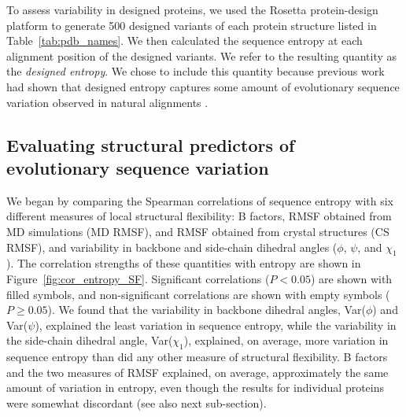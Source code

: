 \documentclass[smallextended]{svjour3}
\begin{document}
To assess variability in designed proteins, we used the Rosetta protein-design platform to generate 500 designed variants of each protein structure listed in Table~\ref{tab:pdb_names}. We then calculated the sequence entropy at each alignment position of the designed variants. We refer to the resulting quantity as the \emph{designed entropy}. We chose to include this quantity because previous work had shown that designed entropy captures some amount of evolutionary sequence variation observed in natural alignments \citep{Jacksonetal2013}.

\subsection*{Evaluating structural predictors of evolutionary sequence variation}

We began by comparing the Spearman correlations of sequence entropy with six different measures of local structural flexibility: B factors, RMSF obtained from MD simulations (MD RMSF), and RMSF obtained from crystal structures (CS RMSF), and variability in backbone and side-chain dihedral angles ($\phi$, $\psi$, and $\chi_1$). The correlation strengths of these quantities with entropy are shown in Figure~\ref{fig:cor_entropy_SF}. Significant correlations ($P<0.05$) are shown with filled symbols, and non-significant correlations are shown with empty symbols ($P\geq0.05$). We found that the variability in backbone dihedral angles, Var($\phi$) and Var($\psi$), explained the least variation in sequence entropy, while the variability in the side-chain dihedral angle, Var($\chi_1$), explained, on average, more variation in sequence entropy than did any other measure of structural flexibility. B factors and the two measures of RMSF explained, on average, approximately the same amount of variation in entropy, even though the results for individual proteins were somewhat discordant (see also next sub-section). 
\end{document}
